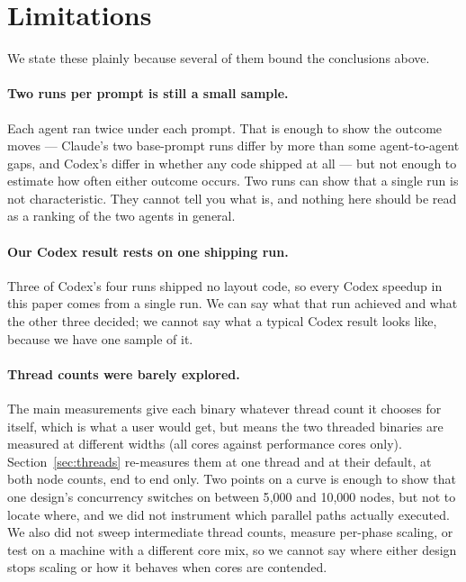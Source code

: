 \section{Limitations}
\label{sec:limitations}

We state these plainly because several of them bound the conclusions above.

\paragraph{Two runs per prompt is still a small sample.}
Each agent ran twice under each prompt. That is enough to show the outcome moves
--- Claude's two base-prompt runs differ by more than some agent-to-agent gaps,
and Codex's differ in whether any code shipped at all --- but not enough to
estimate how often either outcome occurs. Two runs can show that a single run is
not characteristic. They cannot tell you what is, and nothing here should be read as a ranking of
the two agents in general.

\paragraph{Our Codex result rests on one shipping run.}
Three of Codex's four runs shipped no layout code, so every Codex speedup in
this paper comes from a single run. We can say what that run achieved and what
the other three decided; we cannot say what a typical Codex result looks like,
because we have one sample of it.

\paragraph{Thread counts were barely explored.}
The main measurements give each binary whatever thread count it chooses for
itself, which is what a user would get, but means the two threaded binaries are
measured at different widths (all cores against performance cores only).
Section~\ref{sec:threads} re-measures them at one thread and at their default,
at both node counts, end to end only. Two points on a curve is enough to show
that one design's concurrency switches on between 5{,}000 and 10{,}000 nodes,
but not to locate where, and we did not instrument which parallel paths actually
executed. We also did not sweep intermediate thread counts, measure per-phase
scaling, or test on a machine with a different core mix, so we cannot say where
either design stops scaling or how it behaves when cores are contended.

